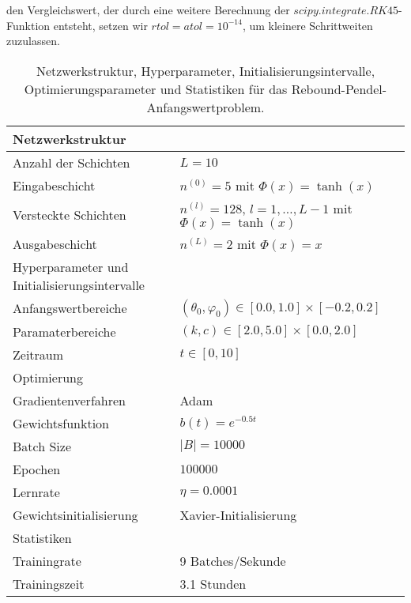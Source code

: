 den Vergleichswert, der durch eine weitere Berechnung der $scipy.integrate.RK45$-Funktion entsteht, setzen wir
$rtol=atol=10^{-14}$, um kleinere Schrittweiten zuzulassen.
\begin{table}
       \renewcommand{\arraystretch}{1.0}
       \centering
       \begin{tabular}{ l | l }
              \hline
              Netzwerkstruktur & \\
              \hline
              Anzahl der Schichten & $L=10$ \\
              Eingabeschicht & $n^{(0)}=5$ mit $\Phi(x)=\tanh(x)$ \\
              Versteckte Schichten & $n^{(l)}=128$, $l = 1, \dots, L-1$ mit $\Phi(x)=\tanh(x)$ \\
              Ausgabeschicht & $n^{(L)}=2$ mit $\Phi(x)=x$ \\
              \hline
              Hyperparameter und Initialisierungsintervalle & \\
              \hline
              Anfangswertbereiche & $(\theta_0, \varphi_0) \in [0.0, 1.0] \times [-0.2, 0.2]$ \\
              Paramaterbereiche & $(k, c) \in [2.0, 5.0] \times [0.0, 2.0]$ \\
              Zeitraum & $t \in [0, 10]$ \\
              \hline
              Optimierung & \\
              \hline
              Gradientenverfahren & Adam \\
              Gewichtsfunktion & $b(t)=e^{-0.5t}$ \\
              Batch Size & $|B|=10000$ \\
              Epochen & $100000$ \\
              Lernrate & $\eta= 0.0001$ \\
              Gewichtsinitialisierung & Xavier-Initialisierung \\
              \hline
              Statistiken & \\
              \hline
              Trainingrate & 9 Batches/Sekunde  \\
              Trainingszeit & 3.1 Stunden \\
              \hline
       \end{tabular}
       \caption{Netzwerkstruktur, Hyperparameter, Initialisierungsintervalle, Optimierungsparameter und Statistiken
       für das Rebound-Pendel-Anfangswertproblem.}
\label{rebound-pendulum-table}
\end{table}
